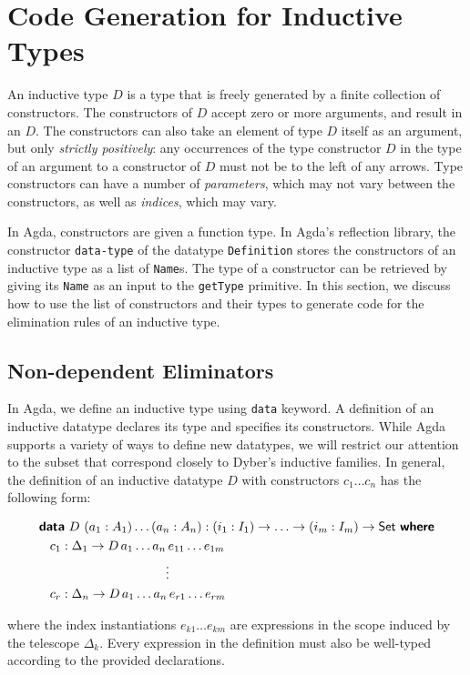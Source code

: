 \documentclass[sigplan,10pt]{acmart}
\begin{document}
\section{Code Generation for Inductive Types}
\label{sec:sec3}
An inductive type $D$ is a type that is freely generated by a finite collection of constructors. The constructors of $D$ accept zero or more arguments, and result in an $D$. The constructors can also take an element of type $D$ itself as an argument, but only \emph{strictly positively}: any occurrences of the type constructor $D$ in the type of an argument to a constructor of $D$ must not be to the left of any arrows.
Type constructors can have a number of \emph{parameters}, which may not vary between the constructors, as well as \emph{indices}, which may vary.


In Agda, constructors are given a function type. In Agda's reflection library, the constructor {\tt data-type} of the datatype {\tt Definition} stores the constructors of an inductive type as a list of \texttt{Name}s. The type of a constructor can be retrieved by giving its {\tt Name} as an input to the {\tt getType} primitive. In this section, we discuss how to use the list of constructors and their types to generate code for the elimination rules of an inductive type.

\subsection{Non-dependent Eliminators}
\label{sec:sec3.1}

\newcommand*{\KW}[1]{\textsf{\textbf{#1}}}
\newcommand*{\SET}{\textsf{Set}}

In Agda, we define an inductive type using {\tt data} keyword. A definition of an inductive datatype declares its type and specifies its constructors.
While Agda supports a variety of ways to define new datatypes, we will restrict our attention to the subset that correspond closely to Dyber's inductive families. In general, the definition of an inductive datatype $D$ with constructors $c_1 \ldots c_n$ has the following form:
\begin{center}
\begingroup
\fontsize{7.9pt}{0pt}\selectfont
\begin{align*}
&\KW{data}\ D\ (a_1 : A_1) \ldots (a_n:A_n) : (i_1 : I_1) \rightarrow\ldots\rightarrow (i_m : I_m) \rightarrow \SET{}\ \KW{where}  \\
&\hspace{0.3cm} c_1 : \Delta_1 \rightarrow D \, a_1 \ldots a_n \, e_{11} \ldots e_{1m}  \\
&\hspace{3.5cm} \vdots  \\
&\hspace{0.3cm} c_r : \Delta_n \rightarrow D \, a_1 \ldots a_n \, e_{r1} \ldots e_{rm}  \\
\end{align*}
\endgroup
\end{center}
\normalsize
where the index instantiations $e_{k1} \ldots e_{km}$ are expressions in the scope induced by the telescope $\Delta_k$. Every expression in the definition must also be well-typed according to the provided declarations.
\end{document}
